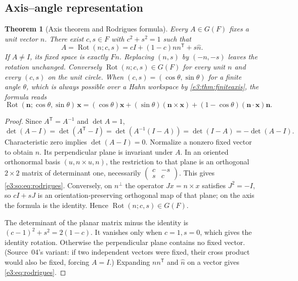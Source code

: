 \documentclass[11pt,letterpaper]{article}
\numberwithin{equation}{section}
\newtheorem{theorem}{Theorem}[section]
\theoremstyle{definition}
\theoremstyle{remark}
\newcommand{\Rot}{\operatorname{Rot}}
\newcommand{\vv}[1]{\bm{#1}}
\newcommand{\transpose}{^{\mathsf T}}
\begin{document}
\subsection{Axis--angle representation}

\begin{theorem}[Axis theorem and Rodrigues formula]\label{e3:thm:rodrigues}\label{e3:so:thm:axis}
Every $A\in G(F)$ fixes a unit vector $n$. There exist $c,s\in F$ with
$c^2+s^2=1$ such that
\begin{equation}\label{e3:so:eq:rodrigues}
 A=\Rot(n;c,s)=cI+(1-c)nn\transpose+s\widehat n.
\end{equation}
If $A\ne I$, its fixed space is exactly $Fn$. Replacing $(n,s)$ by $(-n,-s)$
leaves the rotation unchanged. Conversely $\Rot(n;c,s)\in G(F)$ for every unit
$n$ and every $(c,s)$ on the unit circle. When $(c,s)=(\cos\theta,\sin\theta)$
for a finite angle $\theta$, which is always possible over a Hahn workspace by
\cref{e3:thm:finiteaxis}, the formula reads
\begin{equation}\label{e3:eq:rodrigues}
 \Rot(\vv n;\cos\theta,\sin\theta)\,\vv x=
 (\cos\theta)\vv x+(\sin\theta)(\vv n\times\vv x)
 +(1-\cos\theta)(\vv n\cdot\vv x)\vv n.
\end{equation}
\end{theorem}
\begin{proof}
Since $A\transpose=A^{-1}$ and $\det A=1$,
\[
 \det(A-I)=\det(A\transpose-I)=\det(A^{-1}(I-A))
 =\det(I-A)=-\det(A-I).
\]
Characteristic zero implies $\det(A-I)=0$. Normalize a nonzero fixed vector
to obtain $n$. Its perpendicular plane is invariant under $A$. In an
oriented orthonormal basis $(u,n\times u,n)$, the restriction to that plane
is an orthogonal $2\times2$ matrix of determinant one, necessarily
$\left(\begin{smallmatrix}c&-s\\s&c\end{smallmatrix}\right)$.
This gives \cref{e3:so:eq:rodrigues}. Conversely, on $n^\perp$ the operator
$J x=n\times x$ satisfies $J^2=-I$, so $cI+sJ$ is an orientation-preserving
orthogonal map of that plane; on the axis the formula is the identity. Hence
$\Rot(n;c,s)\in G(F)$.

The determinant of the planar matrix minus the identity is
$(c-1)^2+s^2=2(1-c)$. It vanishes only when $c=1,s=0$, which gives the
identity rotation. Otherwise the perpendicular plane contains no fixed vector.
(Source~04's variant: if two independent vectors were fixed, their cross
product would also be fixed, forcing $A=I$.) Expanding $nn\transpose$ and
$\widehat n$ on a vector gives \cref{e3:eq:rodrigues}.
\end{proof}
\end{document}

